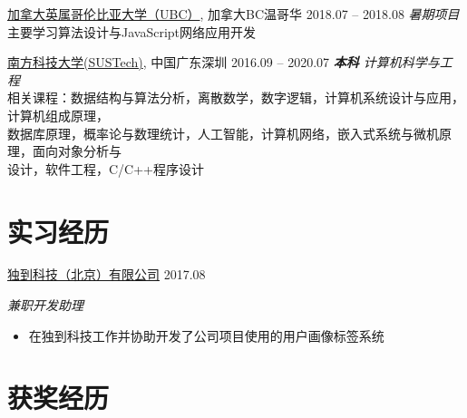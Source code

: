 \documentclass[hidelinks__VERSION__]{adamyi-cv}
\begin{document}
\begin{entrylist}


\entry
{\href{https://www.ubc.ca/}{\heir 加拿大英属哥伦比亚大学（UBC）}, \hei 加拿大BC温哥华}
{2018.07 -- 2018.08}
{\hei \emph{暑期项目}\\
主要学习算法设计与JavaScript网络应用开发
}

\entry
{\href{https://www.sustech.edu.cn/}{\heir 南方科技大学(SUSTech)}, \hei 中国广东深圳}
{2016.09 -- 2020.07}
{\hei \emph{\textbf{\hei 本科} 计算机科学与工程}\\
相关课程：数据结构与算法分析，离散数学，数字逻辑，计算机系统设计与应用，计算机组成原理，\\
数据库原理，概率论与数理统计，人工智能，计算机网络，嵌入式系统与微机原理，面向对象分析与\\
设计，软件工程，C/C++程序设计
}

\end{entrylist}


\section{\heir 实习\heir 经历}

\begin{entrylist}


\entry
{\href{http://www.doodod.com/}{\heir 独到科技（北京）有限公司}}
{2017.08}
{\emph{\hei 兼职开发助理}
\begin{itemize}
\item {\hei 在独到科技工作并协助开发了公司项目使用的用户画像标签系统}
\end{itemize}}


\end{entrylist}


\section{\heir 获奖\heir 经历}
\end{document}
